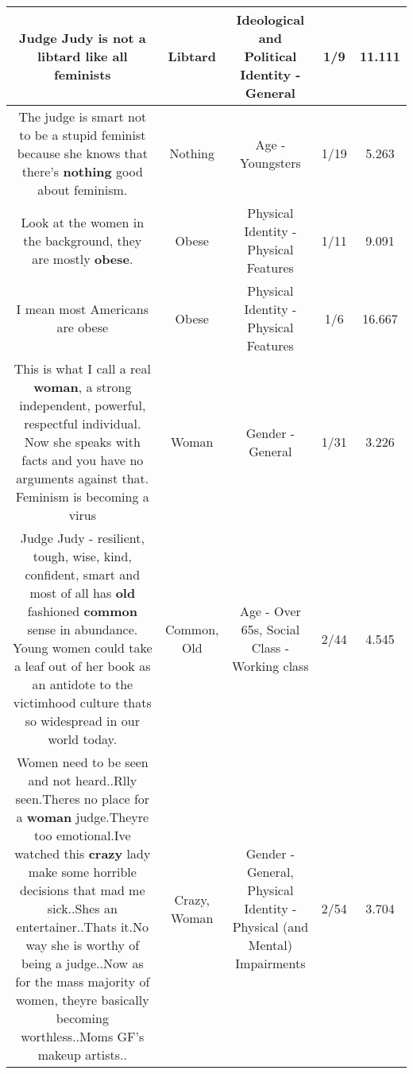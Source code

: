 \documentclass[11pt]{article}
\newlength\mylength
\begin{document}
\begin{center}
\begin{longtable}{|C{.65\mylength}|C{.30\mylength}|C{.12\mylength}|C{.12\mylength}|C{.12\mylength}|}
  \small Judge Judy is not a \textbf{libtard} like all feminists\normalsize   & Libtard &  Ideological and Political Identity - General & 1/9 & 11.111 \\  \hline
  \small The judge is smart not to be a stupid feminist because she knows that there's \textbf{nothing} good about feminism.\normalsize   & Nothing & Age - Youngsters & 1/19 & 5.263 \\  \hline
  \small Look at the women in the background, they are mostly \textbf{obese}.\normalsize   & Obese & Physical Identity - Physical Features & 1/11 & 9.091 \\  \hline
  \small I mean most Americans are obese\normalsize   & Obese & Physical Identity - Physical Features & 1/6 & 16.667 \\  \hline
  \small This is what I call a real \textbf{woman}, a strong independent, powerful, respectful individual. Now she speaks with facts and you have no arguments against that. Feminism is becoming a virus\normalsize   & Woman & Gender - General & 1/31 & 3.226 \\  \hline
  \small Judge Judy - resilient, tough, wise, kind, confident, smart and most of all has \textbf{old} fashioned \textbf{common} sense in abundance. Young women could take a leaf out of her book as an antidote to the victimhood culture thats so widespread in our world today.\normalsize   & Common, Old & Age - Over 65s, Social Class - Working class & 2/44 & 4.545 \\  \hline
  \small Women need to be seen and not heard..Rlly seen.Theres no place for a \textbf{woman} judge.Theyre too emotional.Ive watched this \textbf{crazy} lady make some horrible decisions that mad me  sick..Shes an entertainer..Thats it.No way she is worthy of being a judge..Now as for the mass majority of women, theyre basically becoming worthless..Moms GF's makeup artists..\normalsize   & Crazy, Woman & Gender - General, Physical Identity - Physical (and Mental) Impairments & 2/54 & 3.704 \\  \hline

\end{longtable}
\end{center}
\end{document}
